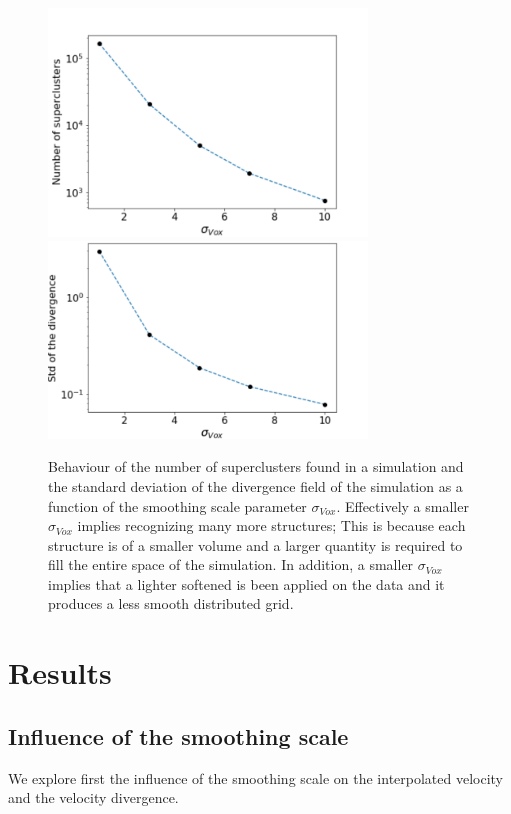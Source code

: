 \documentclass[usenatbib]{mnras}
\begin{document}
\begin{figure}
    \centering
    \includegraphics[width=240pt]{num_superclusters.pdf}
    \includegraphics[width=240pt]{std_smooth.pdf}
    \caption{Behaviour of the number of superclusters found in a
      simulation and the standard deviation of the divergence field of
      the simulation as a function of the smoothing scale parameter
      $\sigma_{Vox}$. Effectively a smaller $\sigma_{Vox}$ implies
      recognizing many more structures; This is because each structure
      is of a smaller volume and a larger quantity is required to fill
      the entire space of the simulation. In addition, a smaller
      $\sigma_{Vox}$ implies that a lighter softened is been applied
      on the data and it produces a less smooth distributed grid.} 
    \label{fig:Nclusters}
\end{figure}

\section{Results}

\subsection{Influence of the smoothing scale}

We explore first the influence of the smoothing scale on the
interpolated velocity and the velocity divergence.
\end{document}
